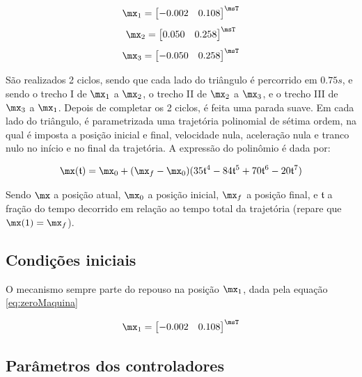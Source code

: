 \documentclass[]{politex}
\begin{document}
\begin{equation} \label{eq:zeroMaquina}
\mx_1 = \begin{bmatrix}
-0.002 & 0.108 
\end{bmatrix}^\msT
\end{equation}
\begin{equation}
\mx_2 = \begin{bmatrix}
0.050 & 0.258 
\end{bmatrix}^\msT
\end{equation}
\begin{equation}
\mx_3 = \begin{bmatrix}
-0.050 & 0.258 
\end{bmatrix}^\msT
\end{equation}

São realizados 2 ciclos, sendo que cada lado do triângulo é percorrido em $0.75s$, e sendo o trecho I de $\mx_1$ a $\mx_2$, o trecho II de $\mx_2$ a $\mx_3$, e o trecho III de $\mx_3$ a $\mx_1$. Depois de completar os 2 ciclos, é feita uma parada suave. Em cada lado do triângulo, é parametrizada uma trajetória polinomial de sétima ordem, na qual é imposta a posição inicial e final, velocidade nula, aceleração nula e tranco nulo no início e no final da trajetória. A expressão do polinômio é dada por:

\begin{equation}
\mx(\mathfrak{t}) = \mx_0 + (\mx_f - \mx_0) (35 \mathfrak{t}^4 - 84 \mathfrak{t}^5 + 70 \mathfrak{t}^6 - 20 \mathfrak{t}^7)
\end{equation}

Sendo $\mx$ a posição atual, $\mx_0$ a posição inicial, $\mx_f$ a posição final, e $\mathfrak{t}$ a fração do tempo decorrido em relação ao tempo total da trajetória (repare que $\mx(1) = \mx_f$).

\subsection{Condições iniciais}

O mecanismo sempre parte do repouso na posição $\mx_1$, dada pela equação \eqref{eq:zeroMaquina}

\begin{equation} \label{eq:zeroMaquina}
\mx_1 = \begin{bmatrix}
-0.002 & 0.108 
\end{bmatrix}^\msT
\end{equation}

\subsection{Parâmetros dos controladores}
\end{document}
